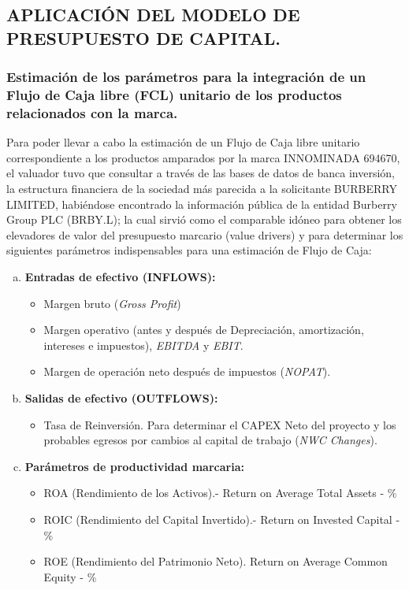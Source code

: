 \subsection{APLICACIÓN DEL MODELO DE PRESUPUESTO DE CAPITAL.}\label{5.1}

\subsubsection{Estimación de los parámetros para la integración de un Flujo de Caja libre (FCL) unitario de los productos relacionados con la marca.}

Para poder llevar a cabo la estimación de un Flujo de Caja libre unitario correspondiente a los productos amparados por la marca INNOMINADA 694670, el valuador tuvo que consultar a través de las bases de datos de banca inversión, la estructura financiera de la sociedad más parecida a la solicitante BURBERRY LIMITED, habiéndose encontrado la información pública de la entidad Burberry Group PLC (BRBY.L); la cual sirvió como el comparable idóneo para obtener los elevadores de valor del presupuesto marcario (value drivers) y para determinar los siguientes parámetros indispensables para una estimación de Flujo de Caja:

\begin{enumerate}[a)]
\item \textbf{Entradas de efectivo (INFLOWS): }
	\begin{itemize}
	\item Margen bruto (\textit{Gross Profit})
	\item Margen operativo (antes y después de Depreciación, amortización, intereses e impuestos), \textit{EBITDA} y \textit{EBIT}. 
	\item Margen de operación neto después de impuestos (\textit{NOPAT}).

	\end{itemize}

\item \textbf{Salidas de efectivo (OUTFLOWS): }
	\begin{itemize}
	\item Tasa de Reinversión. Para determinar el CAPEX Neto del proyecto y los probables egresos por cambios al capital de trabajo (\textit{NWC Changes}).

	\end{itemize}
\item \textbf{Parámetros de productividad marcaria:}
	\begin{itemize}
	\item ROA (Rendimiento de los Activos).- Return on Average Total Assets - \% 
	\item ROIC (Rendimiento del Capital Invertido).- Return on Invested Capital - \%
	\item ROE (Rendimiento del Patrimonio Neto). Return on Average Common Equity - \%
	\end{itemize}	
\end{enumerate}

